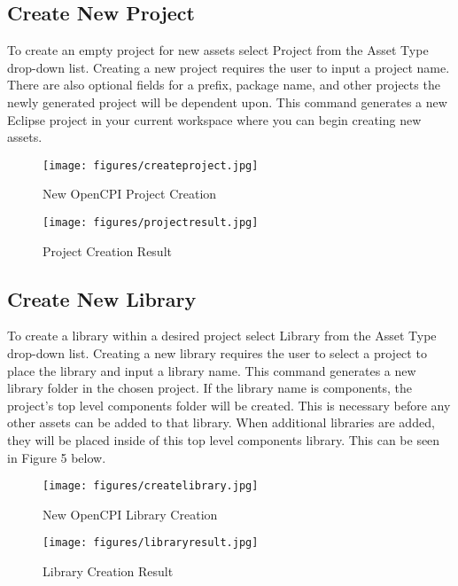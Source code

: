 \newpage

\subsection{Create New Project}
\label{sec:create_project}
\begin{flushleft}

To create an empty project for new assets select Project from the Asset Type drop-down list. Creating a new project requires the user to input a project name. There are also optional fields for a prefix, package name, and other projects the newly generated project will be dependent upon. This command generates a new Eclipse project in your current workspace where you can begin creating new assets.\newline
\begin{figure}[h!]
  \centering
  \texttt{[image: figures/createproject.jpg]}
  \caption{New OpenCPI Project Creation}
  \label{fig:figure2}
\end{figure}

\begin{figure}[h!]
  \centering
  \texttt{[image: figures/projectresult.jpg]}
  \caption{Project Creation Result}
  \label{fig:figure3}
\end{figure}

\end{flushleft}

\newpage

\subsection{Create New Library}
\label{sec:create_library}
\begin{flushleft}

To create a library within a desired project select Library from the Asset Type drop-down list. Creating a new library requires the user to select a project to place the library and input a library name. This command generates a new library folder in the chosen project. If the library name is components, the project's top level components folder will be created. This is necessary before any other assets can be added to that library. When additional libraries are added, they will be placed inside of this top level components library. This can be seen in Figure 5 below.\newline
\begin{figure}[h!]
  \centering
  \texttt{[image: figures/createlibrary.jpg]}
  \caption{New OpenCPI Library Creation}
  \label{fig:figure4}
\end{figure}

\begin{figure}[h!]
  \centering
  \texttt{[image: figures/libraryresult.jpg]}
  \caption{Library Creation Result}
  \label{fig:figure5}
\end{figure}

\end{flushleft}

